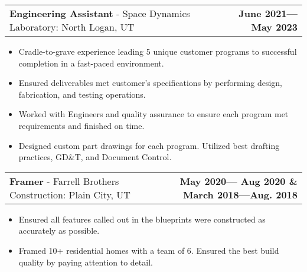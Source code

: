 \documentclass[letterpaper,11pt]{article}
\makeatletter
\newcommand{\resumeExpSubheading}[4]{
  \vspace{-3pt}\item
    \begin{tabular*}{1.0\textwidth}[t]{l@{\extracolsep{\fill}}r}
      \textbf{#1} - \normalsize#2: \small #3 & \textbf{\small #4}
    \end{tabular*}\vspace{-9pt}
}
\newcommand{\resumeItemListStart}{\begin{itemize}}
\newcommand{\resumeItemListEnd}{\end{itemize}\vspace{-5pt}}
\newcommand{\resumeItem}[1]{ 
  \item\small{
    {#1 \vspace{-4pt}}
  }
}
\makeatother
\begin{document}
    \resumeExpSubheading{Engineering Assistant}{Space Dynamics Laboratory}{North Logan, UT}{June 2021—May 2023}  %
    \resumeItemListStart{}
        \resumeItem{Cradle-to-grave experience leading 5 unique customer programs to successful completion in a fast-paced environment.}
        \resumeItem{Ensured deliverables met customer's specifications by performing design, fabrication, and testing operations.}
        \resumeItem{Worked with Engineers and quality assurance to ensure each program met requirements and finished on time. }
        \resumeItem{Designed custom part drawings for each program. Utilized best drafting practices, GD\&T, and Document Control.}
    \resumeItemListEnd{}
    
    \resumeExpSubheading{Framer}{Farrell Brothers Construction}{ Plain City, UT}{May 2020— Aug 2020 \& March 2018—Aug. 2018}  %
      \resumeItemListStart{}
        \resumeItem{Ensured all features called out in the blueprints were constructed as accurately as possible. }
        \resumeItem{Framed 10+ residential homes with a team of 6. Ensured the best build quality by paying attention to detail.}
    \resumeItemListEnd{}

    
\end{document}
